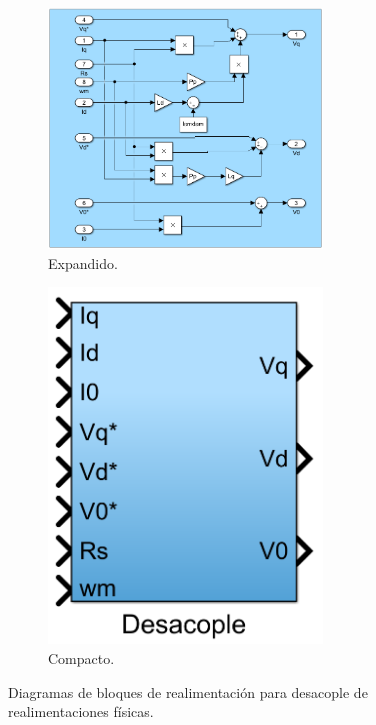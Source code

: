 \documentclass{article}
\begin{document}
\begin{figure}[H]
    \begin{subfigure}[b]{0.75\textwidth}
        \centering
        \includegraphics[width=0.8\textwidth]{desacople_expandido.png}
        \caption{Expandido.}
    \end{subfigure}
    \begin{subfigure}[b]{0.24\textwidth}
        \centering
        \includegraphics[width=0.8\textwidth]{desacople.png}
        \caption{Compacto.}
    \end{subfigure}
    \caption{Diagramas de bloques de realimentación para desacople de realimentaciones físicas.}
\end{figure}
\end{document}

